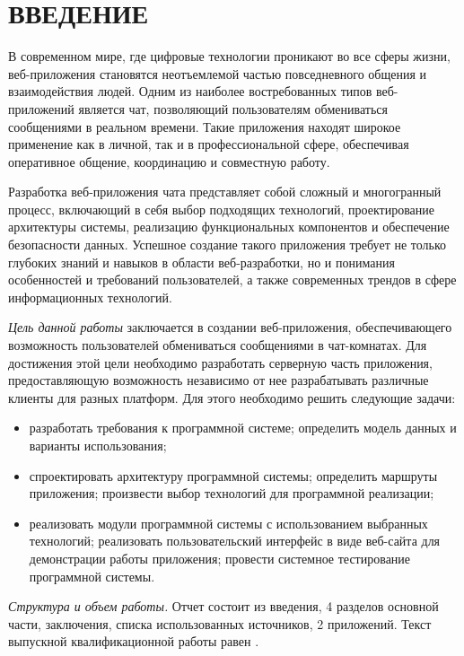 \section*{ВВЕДЕНИЕ}

В современном мире, где цифровые технологии проникают во все сферы жизни, веб-приложения становятся неотъемлемой частью повседневного общения и взаимодействия людей. Одним из наиболее востребованных типов веб-приложений является чат, позволяющий пользователям обмениваться сообщениями в реальном времени. Такие приложения находят широкое применение как в личной, так и в профессиональной сфере, обеспечивая оперативное общение, координацию и совместную работу.

Разработка веб-приложения чата представляет собой сложный и многогранный процесс, включающий в себя выбор подходящих технологий, проектирование архитектуры системы, реализацию функциональных компонентов и обеспечение безопасности данных. Успешное создание такого приложения требует не только глубоких знаний и навыков в области веб-разработки, но и понимания особенностей и требований пользователей, а также современных трендов в сфере информационных технологий.

\emph{Цель данной работы} заключается в создании веб-приложения, обеспечивающего возможность пользователей обмениваться сообщениями в чат-комнатах. Для достижения этой цели необходимо разработать серверную часть приложения, предоставляющую возможность независимо от нее разрабатывать различные клиенты для разных платформ. Для этого необходимо решить следующие задачи:

\begin{itemize}
	\item разработать требования к программной системе; определить модель данных и варианты использования;
	\item спроектировать архитектуру программной системы; определить маршруты приложения; произвести выбор технологий для программной реализации;
	\item реализовать модули программной системы с использованием выбранных технологий; реализовать пользовательский интерфейс в виде веб-сайта для демонстрации работы приложения; провести системное тестирование программной системы. 
\end{itemize}

\emph{Структура и объем работы.} Отчет состоит из введения, 4 разделов основной части, заключения, списка использованных источников, 2 приложений. Текст выпускной квалификационной работы равен .

